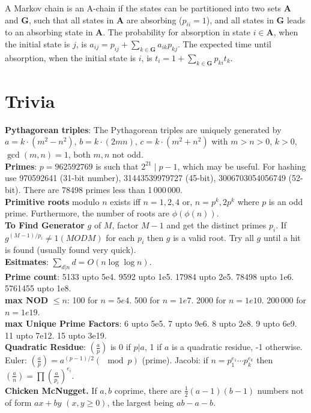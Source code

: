 A Markov chain is an A-chain if the states can be partitioned into two sets $\mathbf{A}$ and $\mathbf{G}$, such that all states in $\mathbf{A}$ are absorbing ($p_{ii}=1$), and all states in $\mathbf{G}$ leads to an absorbing state in $\mathbf{A}$.
The probability for absorption in state $i\in\mathbf{A}$, when the initial state is $j$, is $a_{ij} = p_{ij}+\sum_{k\in\mathbf{G}} a_{ik}p_{kj}$.
The expected time until absorption, when the initial state is $i$, is $t_i = 1+\sum_{k\in\mathbf{G}}p_{ki}t_k$.

\section{Trivia}
\textbf{Pythagorean triples}: The Pythagorean triples are uniquely generated by $a=k\cdot (m^{2}-n^{2})$, $b=k\cdot (2mn)$, $c=k\cdot (m^{2}+n^{2})$ with $m > n > 0$, $k > 0$, $\gcd(m,n) = 1$, both $m, n$ not odd.\\
\textbf{Primes}: $p=962592769$ is such that $2^{21} \mid p-1$, which may be useful. For hashing use 970592641 (31-bit number), 31443539979727 (45-bit), 3006703054056749 (52-bit). There are 78498 primes less than 1\,000\,000.\\
\textbf{Primitive roots} modulo $n$ exists iff $n = 1, 2, 4$ or, $n = p^k, 2p^k$ where $p$ is an odd prime. Furthermore, the number of roots are $\phi (\phi (n))$.\\
\textbf{To Find Generator} $g$ of $M$, factor $M - 1$ and get the distinct primes $p_i$. If $g^{(M - 1) / p_i } \neq 1 (MOD M)$ for each $p_i$ then $g$ is a valid root. Try all $g$ until a hit is found (usually found very quick).\\
\textbf{Esitmates}: $\sum_{d|n} d = O(n \log \log n)$.\\
\textbf{Prime count}: 5133 upto 5e4. 9592 upto 1e5. 17984 upto 2e5. 78498 upto 1e6. 5761455 upto 1e8.\\
\textbf{max NOD} $\leq n$: 100 for $n = 5e4$. 500 for $n = 1e7$. 2000 for $n = 1e10$. 200\,000 for $n = 1e19$.\\
\textbf{max Unique Prime Factors}: 6 upto 5e5. 7 upto 9e6. 8 upto 2e8. 9 upto 6e9. 11 upto 7e12. 15 upto 3e19.\\
\textbf{Quadratic Residue}: $(\frac{a}{p})$ is 0 if $p | a$, 1 if $a$ is a quadratic residue, -1 otherwise. Euler: $(\frac{a}{p}) = a^{(p - 1) / 2} (\mod p)$ (prime). Jacobi: if $n = p_1^{e_1}\cdots p_k^{e_k}$ then $(\frac{a}{n}) = \prod (\frac{a}{p_i})^{e_i}$.\\
\textbf{Chicken McNugget.} If $a, b$ coprime, there are $\frac{1}{2}(a - 1)(b - 1)$ numbers not of form $ax + by$ $(x, y \geq 0)$, the largest being $ab - a - b$.
